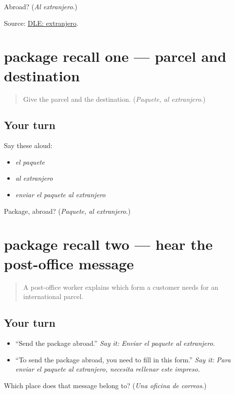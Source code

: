 \begin{tcolorbox}[breakable,colback=teal!4,colframe=teal!35!black,title={Before you move on}]
Abroad? (\emph{Al extranjero}.)

Source: \href{https://dle.rae.es/extranjero}{DLE: extranjero}.
\end{tcolorbox}
\section[(review)]{package recall one — parcel and destination}

\label{lesson:ES-C415-package-recall-1}



\begin{quote}
Give the parcel and the destination. (\emph{Paquete, al extranjero}.)
\end{quote}

\subsection*{Your turn}
Say these aloud:

\begin{itemize}
\raggedright
  \item \emph{el paquete}
  \item \emph{al extranjero}
  \item \emph{enviar el paquete al extranjero}
\end{itemize}

\begin{tcolorbox}[breakable,colback=teal!4,colframe=teal!35!black,title={Before you move on}]
Package, abroad? (\emph{Paquete, al extranjero}.)
\end{tcolorbox}
\section[(review)]{package recall two — hear the post-office message}

\label{lesson:ES-C415-package-recall-2}



\begin{quote}
A post-office worker explains which form a customer needs for an international parcel.
\end{quote}

\subsection*{Your turn}
\begin{itemize}
\raggedright
  \item “Send the package abroad.” \emph{Say it:} \emph{Enviar el paquete al extranjero.}
  \item “To send the package abroad, you need to fill in this form.” \emph{Say it:} \emph{Para enviar el paquete al extranjero, necesita rellenar este impreso.}
\end{itemize}

\begin{tcolorbox}[breakable,colback=teal!4,colframe=teal!35!black,title={Before you move on}]
Which place does that message belong to? (\emph{Una oficina de correos}.)
\end{tcolorbox}
